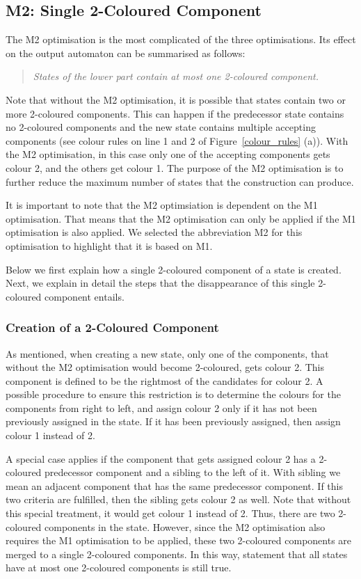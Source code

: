 \subsection{M2: Single 2-Coloured Component}
The M2 optimisation is the most complicated of the three optimisations. Its effect on the output automaton can be summarised as follows:

\begin{quote}
\centering
\textit{States of the lower part contain at most one 2-coloured component.}
\end{quote}

Note that without the M2 optimisation, it is possible that states contain two or more 2-coloured components. This can happen if the predecessor state contains no 2-coloured components and the new state contains multiple accepting components (see colour rules on line 1 and 2 of Figure~\ref{colour_rules} (a)). With the M2 optimisation, in this case only one of the accepting components gets colour 2, and the others get colour 1. The purpose of the M2 optimisation is to further reduce the maximum number of states that the construction can produce. 

It is important to note that the M2 optimsiation is dependent on the M1 optimisation. That means that the M2 optimisation can only be applied if the M1 optimisation is also applied. We selected the abbreviation M2 for this optimisation to highlight that it is based on M1.

Below we first explain how a single 2-coloured component of a state is created. Next, we explain in detail the steps that the disappearance of this single 2-coloured component entails.

\subsubsection{Creation of a 2-Coloured Component}
As mentioned, when creating a new state, only one of the components, that without the M2 optimisation would become 2-coloured, gets colour 2. This component is defined to be the rightmost of the candidates for colour 2. A possible procedure to ensure this restriction is to determine the colours for the components from right to left, and assign colour 2 only if it has not been previously assigned in the state. If it has been previously assigned, then assign colour 1 instead of 2.

A special case applies if the component that gets assigned colour 2 has a 2-coloured predecessor component and a sibling to the left of it. With sibling we mean an adjacent component that has the same predecessor component. If this two criteria are fulfilled, then the sibling gets colour 2 as well. Note that without this special treatment, it would get colour 1 instead of 2. Thus, there are two 2-coloured components in the state. However, since the M2 optimisation also requires the M1 optimisation to be applied, these two 2-coloured components are merged to a single 2-coloured components. In this way, statement that all states have at most one 2-coloured components is still true.


